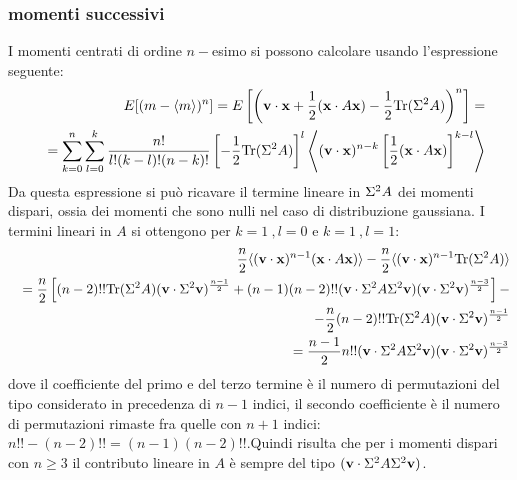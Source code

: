 \subsubsection{momenti successivi}
I momenti centrati di ordine $n-$esimo si possono calcolare usando l'espressione
seguente:
\begin{eqnarray*}
&&E[(m-\langle m\rangle)^n]=E\left[\left({\bf v\cdot x}+\frac{1}{2}({\bf x}\cdot A{\bf x})-\frac{1}{2}{\rm Tr}(\Sigma^2 A)\right)^n\right]=\\
&&=\sum_{k=0}^n\sum_{l=0}^k\frac{n!}{l!(k-l)!(n-k)!}\left[-\frac{1}{2}{\rm Tr}(\Sigma^2 A)\right]^l\left\langle({\bf v\cdot x})^{n-k}\left[\frac{1}{2}({\bf x}\cdot A{\bf x})\right]^{k-l}\right\rangle
\end{eqnarray*}
Da questa espressione si pu\`o ricavare il termine lineare in $\Sigma^2 A$ dei momenti dispari, ossia dei momenti che sono nulli nel caso di distribuzione gaussiana.
I termini lineari in $A$ si ottengono per $k=1\ ,l=0$ e $k=1\ ,l=1$:
\begin{eqnarray*}
&&\frac{n}{2}\langle({\bf v\cdot x})^{n-1}({\bf x}\cdot A{\bf x})\rangle-\frac{n}{2}\langle({\bf v\cdot x})^{n-1}{\rm Tr}(\Sigma^2 A)\rangle\\
&&=\frac{n}{2}\left[(n-2)!!{\rm Tr}(\Sigma^2 A)({\bf v}\cdot\Sigma^2{\bf v})^\frac{n-1}{2}+(n-1)(n-2)!!({\bf v}\cdot\Sigma^2 A\Sigma^2{\bf v})({\bf v}\cdot\Sigma^2{\bf v})^\frac{n-3}{2}\right]-\\
&&-\frac{n}{2}(n-2)!!{\rm Tr}(\Sigma^2 A)({\bf v}\cdot\Sigma^2{\bf v})^\frac{n-1}{2}\\
&&=\frac{n-1}{2}n!!({\bf v}\cdot\Sigma^2 A\Sigma^2{\bf v})({\bf v}\cdot\Sigma^2{\bf v})^\frac{n-3}{2}
\end{eqnarray*}
dove il coefficiente del primo e del terzo termine \`e il numero di permutazioni del tipo considerato in precedenza di $n-1$ indici, il secondo coefficiente \`e il numero
di permutazioni rimaste fra quelle con $n+1$ indici: $n!!-(n-2)!!=(n-1)(n-2)!!$.Quindi risulta che per i momenti dispari con $n\geq 3$ il contributo lineare
in $A$ \`e sempre del tipo $({\bf v}\cdot\Sigma^2 A\Sigma^2{\bf v})$.
